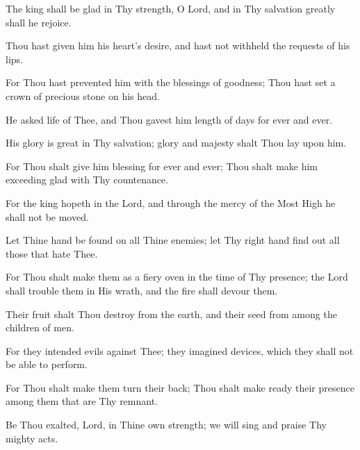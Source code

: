 The king shall be glad in Thy strength, O Lord, and in Thy salvation greatly shall he rejoice.

Thou hast given him his heart's desire, and hast not withheld the requests of his lips.

For Thou hast prevented him with the blessings of goodness; Thou hast set a crown of precious stone on his head.

He asked life of Thee, and Thou gavest him length of days for ever and ever.

His glory is great in Thy salvation; glory and majesty shalt Thou lay upon him.

For Thou shalt give him blessing for ever and ever; Thou shalt make him exceeding glad with Thy countenance.

For the king hopeth in the Lord, and through the mercy of the Most High he shall not be moved.

Let Thine hand be found on all Thine enemies; let Thy right hand find out all those that hate Thee.

For Thou shalt make them as a fiery oven in the time of Thy presence; the Lord shall trouble them in His wrath, and the fire shall devour them.

Their fruit shalt Thou destroy from the earth, and their seed from among the children of men.

For they intended evils against Thee; they imagined devices, which they shall not be able to perform.

For Thou shalt make them turn their back; Thou shalt make ready their presence among them that are Thy remnant.

Be Thou exalted, Lord, in Thine own strength; we will sing and praise Thy mighty acts.

